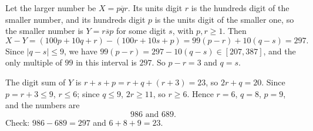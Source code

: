 Let the larger number be $X=\overline{pqr}$. Its units digit $r$ is the hundreds digit of the smaller number, and its hundreds digit $p$ is the units digit of the smaller one, so the smaller number is $Y=\overline{rsp}$ for some digit $s$, with $p,r\ge1$. Then
\[X-Y=(100p+10q+r)-(100r+10s+p)=99(p-r)+10(q-s)=297.\]
Since $|q-s|\le9$, we have $99(p-r)=297-10(q-s)\in[207,387]$, and the only multiple of $99$ in this interval is $297$. So $p-r=3$ and $q=s$.

The digit sum of $Y$ is $r+s+p=r+q+(r+3)=23$, so $2r+q=20$. Since $p=r+3\le9$, $r\le6$; since $q\le9$, $2r\ge11$, so $r\ge6$. Hence $r=6$, $q=8$, $p=9$, and the numbers are
\[\boxed{986\text{ and }689}.\]
Check: $986-689=297$ and $6+8+9=23$.
